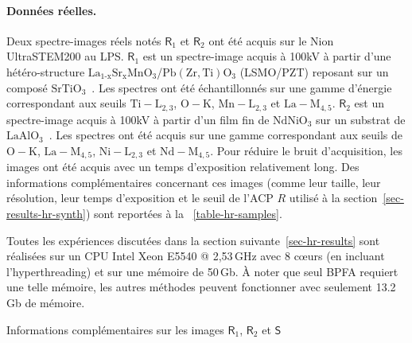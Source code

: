 \paragraph{Données réelles.} Deux spectre-images réels notés $\mathsf{R}_1$ et $\mathsf{R}_2$ ont été acquis sur le Nion UltraSTEM200 au LPS. 
%
$\mathsf{R}_1$ est un spectre-image acquis à 100\;kV à partir d'une hétéro-structure $\mathrm{La}_{1‐\mathrm{x}}\mathrm{Sr}_{\mathrm{x}}\mathrm{MnO}_3$/$\mathrm{Pb}(\mathrm{Zr,Ti})\mathrm{O}_3$ (LSMO/PZT) reposant sur un composé $\mathrm{SrTiO}_3$~\cite{li2016charge}. Les spectres ont été échantillonnés sur une gamme d'énergie correspondant aux seuils $\mathrm{Ti-L}_{2,3}$, $\mathrm{O-K}$, $\mathrm{Mn -L}_{2,3}$ et $\mathrm{La-M}_{4,5}$.
%
$\mathsf{R}_2$ est un spectre-image acquis à 100\;kV à partir d'un film fin de $\mathrm{NdNiO}_3$ sur un substrat de $\mathrm{LaAlO}_3$~\cite{preziosi2018direct}. Les spectres ont été acquis sur une gamme correspondant aux seuils de $\mathrm{O-K}$, $\mathrm{La-M}_{4,5}$, $\mathrm{Ni-L}_{2,3}$ et $\mathrm{Nd-M}_{4,5}$.
%
Pour réduire le bruit d'acquisition, les images ont été acquis avec un temps d'exposition relativement long. Des informations complémentaires concernant ces images (comme leur taille, leur résolution, leur temps d'exposition et le seuil de l'ACP $R$ utilisé à la section~\ref{sec-results-hr-synth}) sont reportées à la \tabname~\ref{table-hr-samples}.

Toutes les expériences discutées dans la section suivante~\ref{sec-hr-results} sont réalisées sur un CPU Intel Xeon E5540 @ 2,53\,GHz avec 8 c\oe{}urs (en incluant l'hyperthreading) et sur une mémoire de 50\,Gb. \`A noter que seul BPFA requiert une telle mémoire, les autres méthodes peuvent fonctionner avec seulement 13.2\,Gb de mémoire.

\begin{table}
    \centering
    
    \caption{Informations complémentaires sur les images $\mathsf{R}_1$, $\mathsf{R}_2$ et $\mathsf{S}$
        \protect\label{table-hr-samples}
    }
\end{table}


